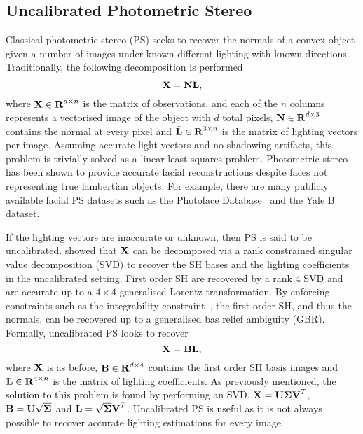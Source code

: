 \subsection{Uncalibrated Photometric Stereo}\label{subsec:uncalibrated_ps}
Classical photometric stereo (PS) seeks to recover the normals of a convex
object given a number of images under known different lighting with known
directions. Traditionally, the following decomposition is performed
\begin{equation}\label{eq:general_ps}
    \boldsymbol{\mathbf{X}} = \boldsymbol{\mathbf{N}} \tilde{\boldsymbol{\mathbf{L}}},
\end{equation}
where $\boldsymbol{\mathbf{X}} \in \boldsymbol{\mathbf{R}}^{d \times n}$ is the matrix of observations,
and each of the $n$ columns represents a vectorised image of the object with $d$
total pixels, $\boldsymbol{\mathbf{N}} \in \boldsymbol{\mathbf{R}}^{d \times 3}$ contains the normal at
every pixel and $\tilde{\boldsymbol{\mathbf{L}}} \in \boldsymbol{\mathbf{R}}^{3 \times n}$ is the matrix
of lighting vectors per image. Assuming accurate light vectors and no shadowing
artifacts, this problem is trivially solved as a linear least squares problem.
Photometric stereo has been shown to provide accurate facial reconstructions
despite faces not representing true lambertian objects. For example, there are
many publicly available facial PS datasets such as the 
Photoface Database~\cite{RefWorks:293} and the 
Yale B~\cite{Georghiades:2001ft} dataset.

If the lighting vectors are inaccurate or unknown, then PS is said to be
uncalibrated. \citet{Basri:2006fo} showed that $\boldsymbol{\mathbf{X}}$ can
be decomposed via a rank constrained singular value decomposition (SVD) to
recover the SH bases and the lighting coefficients in the uncalibrated setting.
First order SH are recovered by a rank 4 SVD and are accurate up to a $4 \times 4$ 
generalised Lorentz transformation. By enforcing constraints such as the
integrability constraint~\cite{RefWorks:99}, the first order SH, and thus the
normals, can be recovered up to a generalised bas relief ambiguity (GBR).
Formally, uncalibrated PS looks to recover
\begin{equation}\label{eq:uncalibrated_ps}
    \boldsymbol{\mathbf{X}} = \boldsymbol{\mathbf{B}} \boldsymbol{\mathbf{L}},
\end{equation}
where $\boldsymbol{\mathbf{X}}$ is as before, $\boldsymbol{\mathbf{B}} \in \boldsymbol{\mathbf{R}}^{d \times 4}$ 
contains the first order SH basis images and
$\boldsymbol{\mathbf{L}} \in \boldsymbol{\mathbf{R}}^{4 \times n}$ is the matrix of lighting coefficients. 
As previously mentioned, the solution to this problem is found by performing an
SVD,
$\boldsymbol{\mathbf{X}} =\nobreak \boldsymbol{\mathbf{U}} \boldsymbol{\mathbf{\Sigma}} \boldsymbol{\mathbf{V}}^T$, $\boldsymbol{\mathbf{B}} = \boldsymbol{\mathbf{U}} \sqrt{\boldsymbol{\mathbf{\Sigma}}}$
and $\boldsymbol{\mathbf{L}} = \sqrt{\boldsymbol{\mathbf{\Sigma}}} \boldsymbol{\mathbf{V}}^T$. 
Uncalibrated PS is useful as it is not always possible to recover accurate 
lighting estimations for every image.
